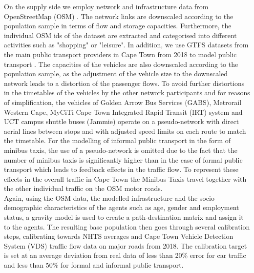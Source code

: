 \documentclass[a4paper]{article}
\begin{document}
On the supply side we employ network and infrastructure data from OpenStreetMap (OSM) \citep{osm}. The network links are downscaled according to the population sample in terms of flow and storage capacities. Furthermore, the individual OSM ids of the dataset are extracted and categorised into different activities such as "shopping" or "leisure". In addition, we use GTFS datasets from the main public transport providers in Cape Town from 2018 to model public transport \citep{transifeeds}. The capacities of the vehicles are also downscaled according to the population sample, as the adjustment of the vehicle size to the downscaled network leads to a distortion of the passenger flows. To avoid further distortions in the timetables of the vehicles by the other network participants and for reasons of simplification, the vehicles of Golden Arrow Bus Services (GABS), Metrorail Western Cape, MyCiTi Cape Town Integrated Rapid Transit (IRT) system and UCT campus shuttle buses (Jammie) operate on a pseudo-network with direct aerial lines between stops and with adjusted speed limits on each route to match the timetable. For the modelling of informal public transport in the form of minibus taxis, the use of a pseudo-network is omitted due to the fact that the number of minibus taxis is significantly higher than in the case of formal public transport which leads to feedback effects in the traffic flow. To represent these effects in the overall traffic in Cape Town the Minibus Taxis travel together with the other individual traffic on the OSM motor roads.\\


Again, using the OSM data, the modelled infrastructure and the socio-demographic characteristics of the agents such as age, gender and employment status, a gravity model is used to create a path-destination matrix and assign it to the agents. The resulting base population then goes through several calibration steps, calibrating towards NHTS averages and Cape Town Vehicle Detection System (VDS) traffic flow data on major roads from 2018. The calibration target is set at an average deviation from real data of less than 20\% error for car traffic and less than 50\% for formal and informal public transport.\\
\end{document}
